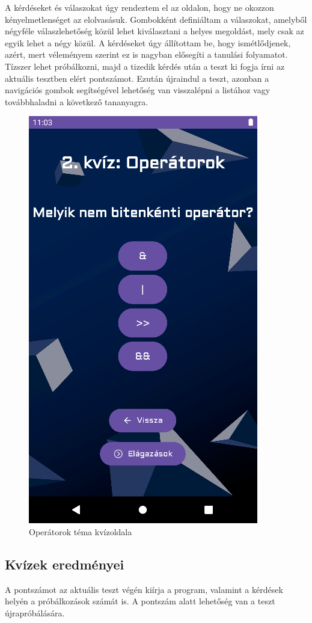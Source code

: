 \documentclass{thesis-ekf}
\begin{document}
A kérdéseket és válaszokat úgy rendeztem el az oldalon, hogy ne okozzon kényelmetlenséget az elolvasásuk. Gombokként definiáltam a válaszokat, amelyből négyféle válaszlehetőség közül lehet kiválasztani a helyes megoldást, mely csak az egyik lehet a négy közül. A kérdéseket úgy állítottam be, hogy ismétlődjenek, azért, mert véleményem szerint ez is nagyban elősegíti a tanulási folyamatot. Tízszer lehet próbálkozni, majd a tizedik kérdés után a teszt ki fogja írni az aktuális tesztben elért pontszámot. Ezután újraindul a teszt, azonban a navigációs gombok segítségével lehetőség van visszalépni a listához vagy továbbhaladni a következő tananyagra.

\begin{figure}[tbh]
	\centering
	\includegraphics[width=0.6\linewidth]{operatorokkviz}
	\caption{Operátorok téma kvízoldala}
	\label{operatorokkviz}
\end{figure}

\subsection{Kvízek eredményei}
A pontszámot az aktuális teszt végén kiírja a program, valamint a kérdések helyén a próbálkozások számát is. A pontszám alatt lehetőség van a teszt újrapróbálására.
\end{document}
